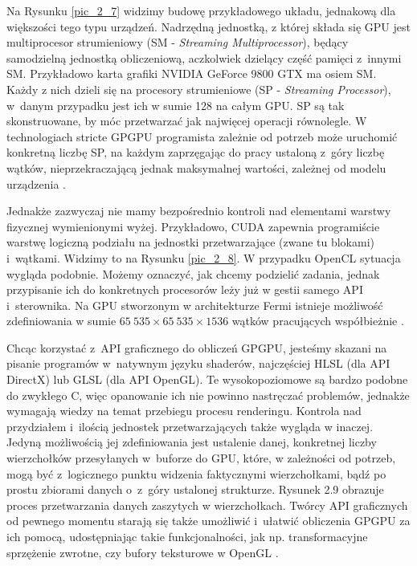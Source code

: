 		Na Rysunku \ref{pic_2_7} widzimy budowę przykładowego układu, jednakową dla większości tego typu urządzeń. Nadrzędną jednostką, z której składa się GPU jest multiprocesor strumieniowy (SM - \emph{Streaming Multiprocessor}), będący samodzielną jednostką obliczeniową, aczkolwiek dzielący część pamięci z~innymi SM. Przykładowo karta grafiki NVIDIA GeForce 9800 GTX ma osiem SM. Każdy z nich dzieli się na procesory strumieniowe (SP - \emph{Streaming Processor}), w~danym przypadku jest ich w sumie 128 na całym GPU. SP są tak skonstruowane, by móc przetwarzać jak najwięcej operacji równolegle. W technologiach stricte GPGPU programista zależnie od potrzeb może uruchomić konkretną liczbę SP, na każdym zaprzęgając do pracy ustaloną z~góry liczbę wątków, nieprzekraczającą jednak maksymalnej wartości, zależnej od modelu urządzenia \cite{cuda}.
		
		
		Jednakże zazwyczaj nie mamy bezpośrednio kontroli nad elementami warstwy fizycznej wymienionymi wyżej. Przykładowo, CUDA zapewnia programiście warstwę logiczną podziału na jednostki przetwarzające (zwane tu blokami) i~wątkami. Widzimy to na Rysunku \ref{pic_2_8}. W przypadku OpenCL sytuacja wygląda podobnie. Możemy oznaczyć, jak chcemy podzielić zadania, jednak przypisanie ich do konkretnych procesorów leży już w gestii samego API i~sterownika. Na GPU stworzonym w architekturze Fermi istnieje możliwość zdefiniowania w sumie \(65\ 535 \times 65\ 535 \times 1536\) wątków pracujących współbieżnie \cite{cuda}.
		
		
		Chcąc korzystać z~API graficznego do obliczeń GPGPU, jesteśmy skazani na pisanie programów w~natywnym języku shaderów, najczęściej HLSL (dla API DirectX) lub GLSL (dla API OpenGL). Te wysokopoziomowe są bardzo podobne do zwykłego C, więc opanowanie ich nie powinno nastręczać problemów, jednakże wymagają wiedzy na temat przebiegu procesu renderingu. Kontrola nad przydziałem i~ilością jednostek przetwarzających także wygląda w inaczej. Jedyną możliwością jej zdefiniowania jest ustalenie danej, konkretnej liczby wierzchołków przesyłanych w~buforze do GPU, które, w zależności od potrzeb, mogą być z~logicznego punktu widzenia faktycznymi wierzchołkami, bądź po prostu zbiorami danych o~z~góry ustalonej strukturze. Rysunek 2.9 obrazuje proces przetwarzania danych zaszytych w wierzchołkach. Twórcy API graficznych od pewnego momentu starają się także umożliwić i~ułatwić obliczenia GPGPU za ich pomocą, udostępniając takie funkcjonalności, jak np. transformacyjne sprzężenie zwrotne, czy bufory teksturowe w OpenGL \cite{receptury}.
		
